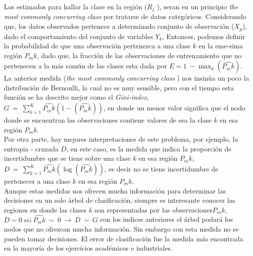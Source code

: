 Los estimados para hallar la clase en la región ($R_j$ ), seran en un principio \textit{the most commonly concurring class}  por tratarse de datos categóricos. Considerando que, los datos observados pertenece a determinado conjunto de observación ($X_p$), dado el comportamiento del conjunto de variables $Y_k$, Entonces, podemos definir la probabilidad de que una observación pertenezca a una clase $k$ en la eme-sima región $P_mk$, dado que, la fracción de las observaciones de entrenamiento que no pertenecen a la más común de las clases esta dada por $E = 1\:-\max_k(\hat{P_mk})$. \\
La anterior medida (\textit{the most commonly concurring class} ) nos insinúa un poco la distribución de Bernoulli, la cual no es muy sensible, pero con el tiempo esta función se ha descrito mejor como el \textit{Gini-index}, $ G \:=\:\sum_{k=1}^{K}\hat{P_mk}(1-(\hat{P_mk}))$, en donde un menor valor significa que el nodo donde se encuentran las observaciones contiene valores de esa la clase $k$ en esa región $P_mk$. \\
Por otra parte, hay mejores interpretaciones de este problema, por ejemplo, la entropia - cruzada $D$, en este caso, es la medida que indica la proporción de incertidumbre que se tiene sobre una clase $k$ en esa región $P_mk$,  $ D \:=\:\sum_{k=1}^{K}\hat{P_mk}(\log(\hat{P_mk}))$, es decir no se tiene incertidumbre de pertenecer a una clase $k$ en esa región $P_mk$. \\
Aunque estas medidas nos ofrecen mucha información para determinar las decisiones en un solo árbol de clasificación, siempre es interesante conocer las regiones en donde las clases $k$ son representadas por las observaciones$P_mk$, $ D \sim 0 \: sii \: \hat{P_mk} \:\sim\: 0 \:\rightarrow\: D\: \sim \: G $  con los indices anteriores el árbol podará los nodos que no ofrezcan mucha información. Sin embargo con esta medida no se pueden tomar decisiones. El error de clasificación fue la medida más encontrada en la mayoría de los ejercicios académicos e industriales.

 
